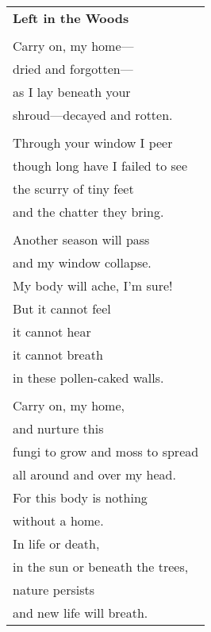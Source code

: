 \documentclass{article}
\begin{document}
\begin{center}
\begin{tabular}{l}
\textbf{Left in the Woods} \\
\\
Carry on, my home--- \\
dried and forgotten--- \\
as I lay beneath your \\
shroud---decayed and rotten. \\
\\
Through your window I peer \\
though long have I failed to see \\
the scurry of tiny feet \\
and the chatter they bring. \\
\\
Another season will pass \\
and my window collapse. \\
My body will ache, I'm sure! \\
But it cannot feel \\
it cannot hear \\
it cannot breath \\
in these pollen-caked walls. \\
\\
Carry on, my home, \\
and nurture this \\
fungi to grow and moss to spread \\
all around and over my head. \\
For this body is nothing \\
without a home. \\
In life or death, \\
in the sun or beneath the trees, \\
nature persists \\
and new life will breath. \\ %
\end{tabular}
\end{center}
\end{document}
